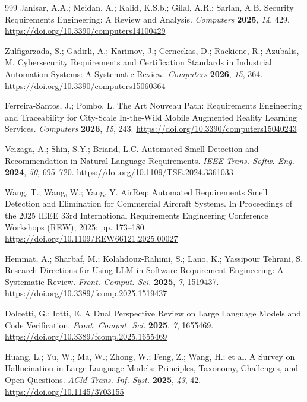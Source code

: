 \documentclass[computers,article,submit,moreauthors]{Definitions/mdpi}
\begin{document}
{\begin{thebibliography}{999}
Janisar, A.A.; Meidan, A.; Kalid, K.S.b.; Gilal, A.R.; Sarlan, A.B. Security Requirements Engineering: A Review and Analysis. {\em Computers} {\bf 2025}, {\em 14}, 429. \url{https://doi.org/10.3390/computers14100429}

Zulfigarzada, S.; Gadirli, A.; Karimov, J.; Cerneckas, D.; Rackiene, R.; Azubalis, M. Cybersecurity Requirements and Certification Standards in Industrial Automation Systems: A Systematic Review. {\em Computers} {\bf 2026}, {\em 15}, 364. \url{https://doi.org/10.3390/computers15060364}

Ferreira-Santos, J.; Pombo, L. The Art Nouveau Path: Requirements Engineering and Traceability for City-Scale In-the-Wild Mobile Augmented Reality Learning Services. {\em Computers} {\bf 2026}, {\em 15}, 243. \url{https://doi.org/10.3390/computers15040243}

Veizaga, A.; Shin, S.Y.; Briand, L.C. Automated Smell Detection and Recommendation in Natural Language Requirements. {\em IEEE Trans. Softw. Eng.} {\bf 2024}, {\em 50}, 695--720. \url{https://doi.org/10.1109/TSE.2024.3361033}

Wang, T.; Wang, W.; Yang, Y. AirReq: Automated Requirements Smell Detection and Elimination for Commercial Aircraft Systems. In Proceedings of the 2025 IEEE 33rd International Requirements Engineering Conference Workshops (REW), 2025; pp. 173--180. \url{https://doi.org/10.1109/REW66121.2025.00027}

Hemmat, A.; Sharbaf, M.; Kolahdouz-Rahimi, S.; Lano, K.; Yassipour Tehrani, S. Research Directions for Using LLM in Software Requirement Engineering: A Systematic Review. {\em Front. Comput. Sci.} {\bf 2025}, {\em 7}, 1519437. \url{https://doi.org/10.3389/fcomp.2025.1519437}

Dolcetti, G.; Iotti, E. A Dual Perspective Review on Large Language Models and Code Verification. {\em Front. Comput. Sci.} {\bf 2025}, {\em 7}, 1655469. \url{https://doi.org/10.3389/fcomp.2025.1655469}

Huang, L.; Yu, W.; Ma, W.; Zhong, W.; Feng, Z.; Wang, H.; et al. A Survey on Hallucination in Large Language Models: Principles, Taxonomy, Challenges, and Open Questions. {\em ACM Trans. Inf. Syst.} {\bf 2025}, {\em 43}, 42. \url{https://doi.org/10.1145/3703155}


\end{thebibliography}}
\end{document}
